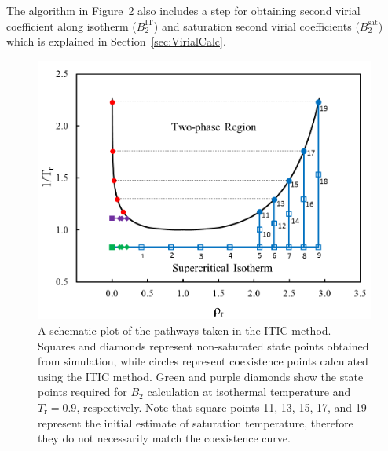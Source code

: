 \documentclass[5p,times]{elsarticle}
\begin{document}
The algorithm in Figure~2 also includes a step for obtaining second virial coefficient along isotherm ($B_2^\mathrm{IT}$) and saturation second virial coefficients ($B_2^\mathrm{sat}$) which is explained in Section~\ref{sec:VirialCalc}.
\begin{figure}
\includegraphics[scale=0.45]{Figures/ITIC-pathway-C2.png}
\caption{A schematic plot of the pathways taken in the ITIC method. Squares and diamonds represent non-saturated state points obtained from simulation, while circles represent coexistence points calculated using the ITIC method. Green and purple diamonds show the state points required for $B_2$ calculation at isothermal temperature and $T_\mathrm{r}=0.9$, respectively. Note that square points 11, 13, 15, 17, and 19 represent the initial estimate of saturation temperature, therefore they do not necessarily match the coexistence curve.}
\label{fig:ITICpathway}
\end{figure}



\end{document}
